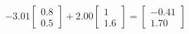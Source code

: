 \documentclass[preview]{standalone}
\begin{document}
\begin{align*}
-3.01 \begin{bmatrix} 0.8 \\ 0.5 \end{bmatrix} + 2.00 \begin{bmatrix} 1 \\ 1.6 \end{bmatrix} = \begin{bmatrix} -0.41 \\ 1.70 \end{bmatrix}
\end{align*}
\end{document}
